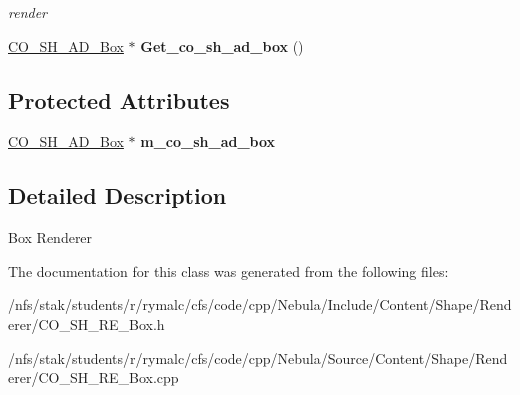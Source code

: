 \begin{DoxyCompactItemize}
\begin{DoxyCompactList}\small\item\em render \item\end{DoxyCompactList}\item 
\hypertarget{classContent_1_1Shape_1_1Renderer_1_1Box_a574b3b7e01f2799b8fbe6daeb92729ab}{
\hyperlink{classContent_1_1Shape_1_1Admin_1_1Box}{CO\_\-SH\_\-AD\_\-Box} $\ast$ {\bfseries Get\_\-co\_\-sh\_\-ad\_\-box} ()}
\label{classContent_1_1Shape_1_1Renderer_1_1Box_a574b3b7e01f2799b8fbe6daeb92729ab}

\end{DoxyCompactItemize}
\subsection*{Protected Attributes}
\begin{DoxyCompactItemize}
\item 
\hypertarget{classContent_1_1Shape_1_1Renderer_1_1Box_ac792f226fbe3f890af6ed331c2331b2d}{
\hyperlink{classContent_1_1Shape_1_1Admin_1_1Box}{CO\_\-SH\_\-AD\_\-Box} $\ast$ {\bfseries m\_\-co\_\-sh\_\-ad\_\-box}}
\label{classContent_1_1Shape_1_1Renderer_1_1Box_ac792f226fbe3f890af6ed331c2331b2d}

\end{DoxyCompactItemize}


\subsection{Detailed Description}
Box Renderer 

The documentation for this class was generated from the following files:\begin{DoxyCompactItemize}
\item 
/nfs/stak/students/r/rymalc/cfs/code/cpp/Nebula/Include/Content/Shape/Renderer/CO\_\-SH\_\-RE\_\-Box.h\item 
/nfs/stak/students/r/rymalc/cfs/code/cpp/Nebula/Source/Content/Shape/Renderer/CO\_\-SH\_\-RE\_\-Box.cpp\end{DoxyCompactItemize}
